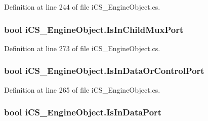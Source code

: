 Definition at line 244 of file i\+C\+S\+\_\+\+Engine\+Object.\+cs.

\hypertarget{classi_c_s___engine_object_a5a0ccb5e2d844633e7537028d93725b9}{
\subsubsection[{Is\+In\+Child\+Mux\+Port}]{\setlength{\rightskip}{0pt plus 5cm}bool i\+C\+S\+\_\+\+Engine\+Object.\+Is\+In\+Child\+Mux\+Port\hspace{0.3cm}{\ttfamily [get]}}}\label{classi_c_s___engine_object_a5a0ccb5e2d844633e7537028d93725b9}


Definition at line 273 of file i\+C\+S\+\_\+\+Engine\+Object.\+cs.

\hypertarget{classi_c_s___engine_object_a3107e1ca564a3cf6f1046c1bb29ff7e2}{
\subsubsection[{Is\+In\+Data\+Or\+Control\+Port}]{\setlength{\rightskip}{0pt plus 5cm}bool i\+C\+S\+\_\+\+Engine\+Object.\+Is\+In\+Data\+Or\+Control\+Port\hspace{0.3cm}{\ttfamily [get]}}}\label{classi_c_s___engine_object_a3107e1ca564a3cf6f1046c1bb29ff7e2}


Definition at line 265 of file i\+C\+S\+\_\+\+Engine\+Object.\+cs.

\hypertarget{classi_c_s___engine_object_a364300be6328d4195c47ed58c67721f3}{
\subsubsection[{Is\+In\+Data\+Port}]{\setlength{\rightskip}{0pt plus 5cm}bool i\+C\+S\+\_\+\+Engine\+Object.\+Is\+In\+Data\+Port\hspace{0.3cm}{\ttfamily [get]}}}\label{classi_c_s___engine_object_a364300be6328d4195c47ed58c67721f3}


